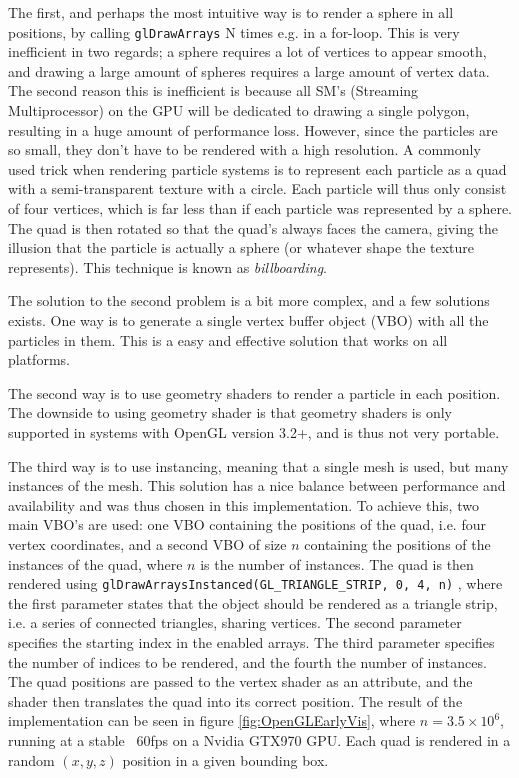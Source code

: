 The first, and perhaps the most intuitive way is to render a sphere in all positions, by calling \lstinline{glDrawArrays} N times e.g. in a for-loop. This is very inefficient in two regards; a sphere requires a lot of vertices to appear smooth, and drawing a large amount of spheres requires a large amount of vertex data. The second reason this is inefficient is because all SM's (Streaming Multiprocessor) on the GPU will be dedicated to drawing a single polygon, resulting in a huge amount of performance loss. However, since the particles are so small, they don't have to be rendered with a high resolution. A commonly used trick when rendering particle systems is to represent each particle as a quad with a semi-transparent texture with a circle. Each particle will thus only consist of four vertices, which is far less than if each particle was represented by a sphere. The quad is then rotated so that the quad's always faces the camera, giving the illusion that the particle is actually a sphere (or whatever shape the texture represents). This technique is known as \textit{billboarding}.


The solution to the second problem is a bit more complex, and a few solutions exists.
One way is to generate a single vertex buffer object (VBO) with all the particles in them. This is a easy and effective solution that works on all platforms. 

The second way is to use geometry shaders to render a particle in each position. The downside to using geometry shader is that geometry shaders is only supported in systems with OpenGL version 3.2+, and is thus not very portable. 

The third way is to use instancing, meaning that a single mesh is used, but many instances of the mesh. This solution has a nice balance between performance and availability and was thus chosen in this implementation. To achieve this, two main VBO's are used: one VBO containing the positions of the quad, i.e. four vertex coordinates, and a second VBO of size $n$ containing the positions of the instances of the quad, where $n$ is the number of instances. The quad is then rendered using \lstinline{glDrawArraysInstanced(GL_TRIANGLE_STRIP, 0, 4, n)} \cite{OpenCLDocs}, where the first parameter states that the object should be rendered as a triangle strip, i.e. a series of connected triangles, sharing vertices. The second parameter specifies the starting index in the enabled arrays. The third parameter specifies the number of indices to be rendered, and the fourth the number of instances. The quad positions are passed to the vertex shader as an attribute, and the shader then translates the quad into its correct position. The result of the implementation can be seen in figure \ref{fig:OpenGLEarlyVis}, where $n=3.5 \times 10^6$, running at a stable ~60fps on a Nvidia GTX970 GPU. Each quad is rendered in a random $(x,y,z)$ position in a given bounding box.


